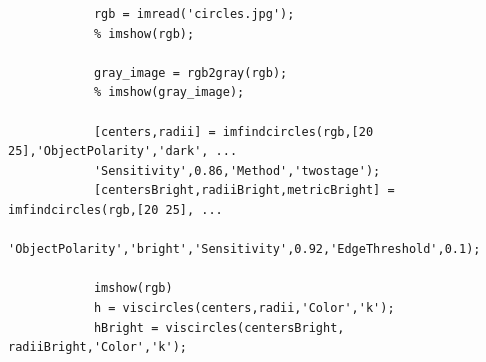 \documentclass[12pt,a4paper,colorlinks=true]{article}
\begin{document}
		\begin{lstlisting}
			rgb = imread('circles.jpg');
			% imshow(rgb);
			
			gray_image = rgb2gray(rgb);
			% imshow(gray_image);
			
			[centers,radii] = imfindcircles(rgb,[20 25],'ObjectPolarity','dark', ...
			'Sensitivity',0.86,'Method','twostage');
			[centersBright,radiiBright,metricBright] = imfindcircles(rgb,[20 25], ...
			'ObjectPolarity','bright','Sensitivity',0.92,'EdgeThreshold',0.1);
			
			imshow(rgb)
			h = viscircles(centers,radii,'Color','k');
			hBright = viscircles(centersBright, radiiBright,'Color','k');
		\end{lstlisting}
	
	\newpage
	
	
	
\end{document}

